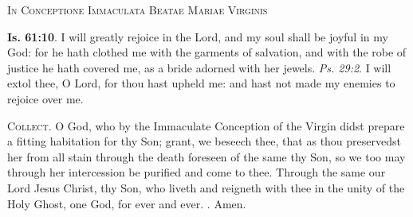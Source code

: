 \documentclass[11pt]{article} %
\begin{document}
\begin{center}\begin{huge}
  \textsc{In Conceptione Immaculata Beatae Mariae Virginis}
\end{huge}\end{center}

\def\greinitialformat#1{%
  {\fontsize{34}{34}\selectfont #1}%
}

\textbf{Is. 61:10}. I will greatly rejoice in the Lord, and my soul shall be
joyful in my God: for he hath clothed me with the garments of salvation, and
with the robe of justice he hath covered me, as a bride adorned with her jewels.
\emph{Ps. 29:2}. I will extol thee, O Lord, for thou hast upheld me: and hast
not made my enemies to rejoice over me.



\vskip10pt

\textsc{Collect}. O God, who by the Immaculate Conception of the Virgin didst
prepare a fitting habitation for thy Son; grant, we beseech thee, that as thou
preservedst her from all stain through the death foreseen of the same thy Son,
so we too may through her intercession be purified and come to thee.
Through the same our Lord Jesus Christ, thy Son, who liveth and reigneth with
thee in the unity of the Holy Ghost, one God, for ever and ever. \Rbar{}. Amen.


\vskip10pt
  
\end{document}
